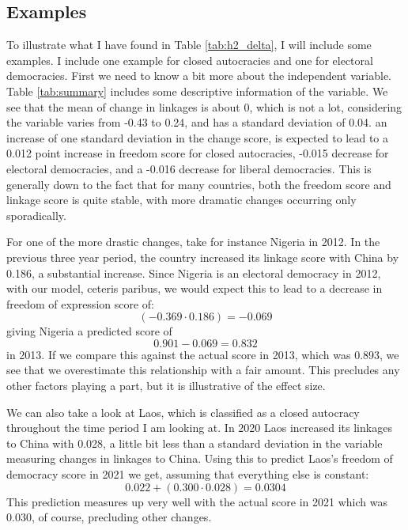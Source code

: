 \subsection{Examples}
To illustrate what I have found in Table \ref{tab:h2_delta}, I will include some examples. I include one example for closed autocracies and one for electoral democracies. First we need to know a bit more about the independent variable. Table \ref{tab:summary} includes some descriptive information of the variable. We see that the mean of change in linkages is about 0, which is not a lot, considering the variable varies from -0.43 to 0.24, and has a standard deviation of 0.04. an increase of one standard deviation in the change score, is expected to lead to a 0.012 point increase in freedom score for closed autocracies, -0.015 decrease for electoral democracies, and a -0.016 decrease for liberal democracies. This is generally down to the fact that for many countries, both the freedom score and linkage score is quite stable, with more dramatic changes occurring only sporadically. 

For one of the more drastic changes, take for instance Nigeria in 2012. In the previous three year period, the country increased its linkage score with China by 0.186, a substantial increase. Since Nigeria is an electoral democracy in 2012, with our model, ceteris paribus, we would expect this to lead to a decrease in freedom of expression score of:
\begin{equation} \label{nigeria_decrease}
    (-0.369 \cdot 0.186)  = -0.069
\end{equation}
giving Nigeria a predicted score of
\begin{equation} \label{nigeria_score}
    0.901 - 0.069 = 0.832
\end{equation}
in 2013. If we compare this against the actual score in 2013, which was 0.893, we see that we overestimate this relationship with a fair amount. This precludes any other factors playing a part, but it is illustrative of the effect size.

We can also take a look at Laos, which is classified as a closed autocracy throughout the time period I am looking at. In 2020 Laos increased its linkages to China with 0.028, a little bit less than a standard deviation in the variable measuring changes in linkages to China. Using this to predict Laos's freedom of democracy score in 2021 we get, assuming that everything else is constant:
\begin{equation}
    0.022 + (0.300 \cdot 0.028) = 0.0304
\end{equation}
This prediction measures up very well with the actual score in 2021 which was 0.030, of course, precluding other changes.


